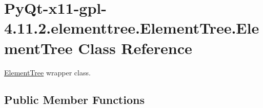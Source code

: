 \hypertarget{classPyQt-x11-gpl-4_811_82_1_1elementtree_1_1ElementTree_1_1ElementTree}{}\section{Py\+Qt-\/x11-\/gpl-\/4.11.2.elementtree.\+Element\+Tree.\+Element\+Tree Class Reference}
\label{classPyQt-x11-gpl-4_811_82_1_1elementtree_1_1ElementTree_1_1ElementTree}


\hyperlink{classPyQt-x11-gpl-4_811_82_1_1elementtree_1_1ElementTree_1_1ElementTree}{Element\+Tree} wrapper class.  


\subsection*{Public Member Functions}
